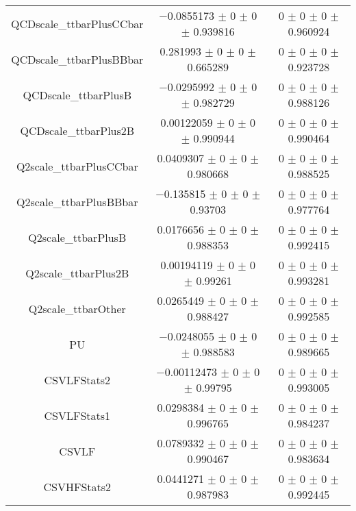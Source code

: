 \begin{table}
\begin{tabular}{ccc}
QCDscale\_ttbarPlusCCbar & \num{-0.0855173} $\pm$ \num{0} $\pm$ \num{0} $\pm$ \num{0.939816} & \num{0} $\pm$ \num{0} $\pm$ \num{0} $\pm$ \num{0.960924}\\
QCDscale\_ttbarPlusBBbar & \num{0.281993} $\pm$ \num{0} $\pm$ \num{0} $\pm$ \num{0.665289} & \num{0} $\pm$ \num{0} $\pm$ \num{0} $\pm$ \num{0.923728}\\
QCDscale\_ttbarPlusB & \num{-0.0295992} $\pm$ \num{0} $\pm$ \num{0} $\pm$ \num{0.982729} & \num{0} $\pm$ \num{0} $\pm$ \num{0} $\pm$ \num{0.988126}\\
QCDscale\_ttbarPlus2B & \num{0.00122059} $\pm$ \num{0} $\pm$ \num{0} $\pm$ \num{0.990944} & \num{0} $\pm$ \num{0} $\pm$ \num{0} $\pm$ \num{0.990464}\\
Q2scale\_ttbarPlusCCbar & \num{0.0409307} $\pm$ \num{0} $\pm$ \num{0} $\pm$ \num{0.980668} & \num{0} $\pm$ \num{0} $\pm$ \num{0} $\pm$ \num{0.988525}\\
Q2scale\_ttbarPlusBBbar & \num{-0.135815} $\pm$ \num{0} $\pm$ \num{0} $\pm$ \num{0.93703} & \num{0} $\pm$ \num{0} $\pm$ \num{0} $\pm$ \num{0.977764}\\
Q2scale\_ttbarPlusB & \num{0.0176656} $\pm$ \num{0} $\pm$ \num{0} $\pm$ \num{0.988353} & \num{0} $\pm$ \num{0} $\pm$ \num{0} $\pm$ \num{0.992415}\\
Q2scale\_ttbarPlus2B & \num{0.00194119} $\pm$ \num{0} $\pm$ \num{0} $\pm$ \num{0.99261} & \num{0} $\pm$ \num{0} $\pm$ \num{0} $\pm$ \num{0.993281}\\
Q2scale\_ttbarOther & \num{0.0265449} $\pm$ \num{0} $\pm$ \num{0} $\pm$ \num{0.988427} & \num{0} $\pm$ \num{0} $\pm$ \num{0} $\pm$ \num{0.992585}\\
PU & \num{-0.0248055} $\pm$ \num{0} $\pm$ \num{0} $\pm$ \num{0.988583} & \num{0} $\pm$ \num{0} $\pm$ \num{0} $\pm$ \num{0.989665}\\
CSVLFStats2 & \num{-0.00112473} $\pm$ \num{0} $\pm$ \num{0} $\pm$ \num{0.99795} & \num{0} $\pm$ \num{0} $\pm$ \num{0} $\pm$ \num{0.993005}\\
CSVLFStats1 & \num{0.0298384} $\pm$ \num{0} $\pm$ \num{0} $\pm$ \num{0.996765} & \num{0} $\pm$ \num{0} $\pm$ \num{0} $\pm$ \num{0.984237}\\
CSVLF & \num{0.0789332} $\pm$ \num{0} $\pm$ \num{0} $\pm$ \num{0.990467} & \num{0} $\pm$ \num{0} $\pm$ \num{0} $\pm$ \num{0.983634}\\
CSVHFStats2 & \num{0.0441271} $\pm$ \num{0} $\pm$ \num{0} $\pm$ \num{0.987983} & \num{0} $\pm$ \num{0} $\pm$ \num{0} $\pm$ \num{0.992445}\\

\end{tabular}
\end{table}
